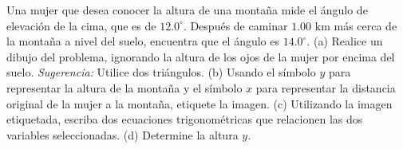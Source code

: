 \item Una mujer que desea conocer la altura de una montaña mide el ángulo de elevación de la cima, que es de $12.0^\circ$. Después de caminar $1.00 \text{ km}$ más cerca de la montaña a nivel del suelo, encuentra que el ángulo es $14.0^\circ$. (a) Realice un dibujo del problema, ignorando la altura de los ojos de la mujer por encima del suelo. \textit{Sugerencia:} Utilice dos triángulos. (b) Usando el símbolo $y$ para representar la altura de la montaña y el símbolo $x$ para representar la distancia original de la mujer a la montaña, etiquete la imagen. (c) Utilizando la imagen etiquetada, escriba dos ecuaciones trigonométricas que relacionen las dos variables seleccionadas. (d) Determine la altura $y$.
